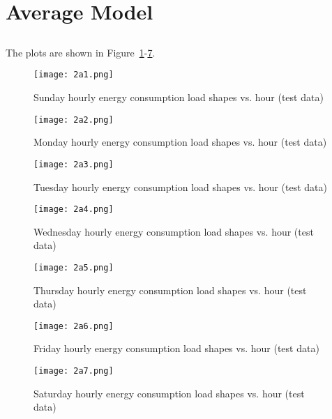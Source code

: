 \documentclass[12pt]{article}
\begin{document}
\section{Average Model}
\subsection{}
The plots are shown in Figure~\ref{fig:2a1}-\ref{fig:2a7}.
\begin{figure}[H]
	\centering
	\texttt{[image: 2a1.png]}
	\vspace{-1cm}      
	\caption{Sunday hourly energy consumption load shapes vs. hour (test data)}
	\label{fig:2a1}
\end{figure}
\begin{figure}[H]
	\centering
	\texttt{[image: 2a2.png]}
	\vspace{-1cm}      
	\caption{Monday hourly energy consumption load shapes vs. hour (test data)}
	\label{fig:2a2}
\end{figure}
\begin{figure}[H]
	\centering
	\texttt{[image: 2a3.png]}
	\vspace{-1cm}      
	\caption{Tuesday hourly energy consumption load shapes vs. hour (test data)}
	\label{fig:2a3}
\end{figure}
\begin{figure}[H]
	\centering
	\texttt{[image: 2a4.png]}
	\vspace{-1cm}      
	\caption{Wednesday hourly energy consumption load shapes vs. hour (test data)}
	\label{fig:2a4}
\end{figure}
\begin{figure}[H]
	\centering
	\texttt{[image: 2a5.png]}
	\vspace{-1cm}      
	\caption{Thursday hourly energy consumption load shapes vs. hour (test data)}
	\label{fig:2a5}
\end{figure}
\begin{figure}[H]
	\centering
	\texttt{[image: 2a6.png]}
	\vspace{-1cm}      
	\caption{Friday hourly energy consumption load shapes vs. hour (test data)}
	\label{fig:2a6}
\end{figure}
\begin{figure}[H]
	\centering
	\texttt{[image: 2a7.png]}
	\vspace{-1cm}      
	\caption{Saturday hourly energy consumption load shapes vs. hour (test data)}
	\label{fig:2a7}
\end{figure}
\end{document}
